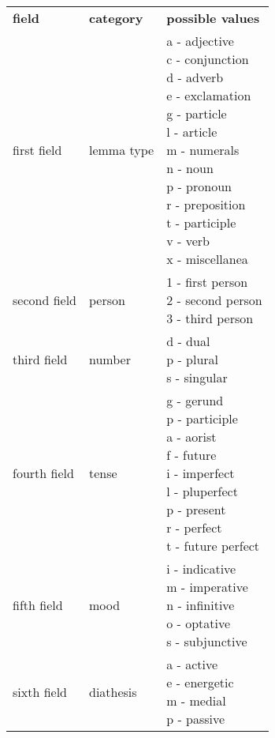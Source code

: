 \begin{table}
  \begin{tabular}{|l|l|l|}
        \hline
        \textbf{field}            & \textbf{category} & \textbf{possible values} \\ \thickhline
            first field  & lemma type & \specialcell{a - adjective\\c - conjunction\\d - adverb\\e - exclamation\\g - particle\\l - article\\m - numerals\\n - noun\\p - pronoun\\r - preposition\\t - participle\\v - verb\\x - miscellanea} \\ \hline
            second field & person & \specialcell{1 - first person\\2 - second person\\3 - third person} \\ \hline
            third field  & number & \specialcell{d - dual\\p - plural\\s - singular} \\ \hline
            fourth field & tense & \specialcell{g - gerund \\ p - participle \\ a - aorist\\f - future\\i - imperfect\\l - pluperfect\\p - present\\r - perfect\\t - future perfect} \\ \hline
             fifth field & mood & \specialcell{i - indicative\\m - imperative\\n - infinitive\\o - optative\\s - subjunctive} \\ \hline
             sixth field & diathesis & \specialcell{a - active\\e - energetic\\m - medial\\p - passive} \\ \hline

\end{tabular}
\end{table}
